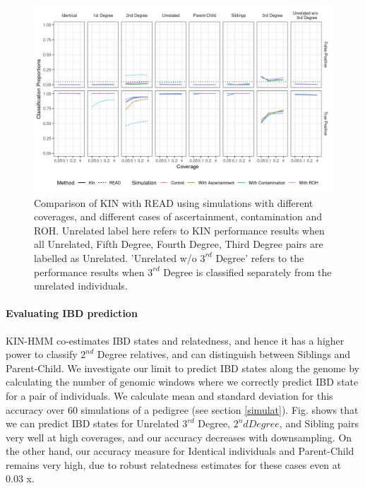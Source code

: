 \documentclass[12pt, letterpaper]{article}
\begin{document}
\begin{figure}[h!]
    \includegraphics[width=16cm]{plots/plotimg/comparison_plot.png}
    \centering
    \caption{Comparison of KIN with READ using simulations with different coverages, and different cases of ascertainment, contamination and ROH. Unrelated label here refers to KIN performance results when all Unrelated, Fifth Degree, Fourth Degree, Third Degree pairs are labelled as Unrelated. 'Unrelated w/o $3^{rd}$ Degree' refers to the performance results when $3^{rd}$ Degree is classified separately from the unrelated individuals.}
    \label{fig4:Comparison_READ_KIN}
\end{figure}

\paragraph{Evaluating IBD prediction}
KIN-HMM co-estimates IBD states and relatedness, and hence it has a higher power to classify $2^{nd}$ Degree relatives, and can distinguish between Siblings and Parent-Child. We investigate our limit to predict IBD states along the genome by calculating the number of genomic windows where we correctly  predict IBD state for a pair of individuals. We calculate mean and standard deviation for this accuracy over 60 simulations of a pedigree (see section \ref{simulat}). Fig. shows that we can predict IBD states for Unrelated $3^{rd}$ Degree, $2^nd Degree$, and Sibling pairs very well at high coverages, and our accuracy decreases with downsampling. On the other hand, our accuracy measure for Identical individuals and Parent-Child remains very high, due to robust relatedness estimates for these cases even at 0.03 x.  
\end{document}
